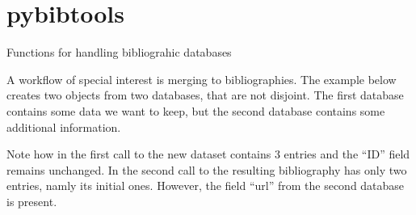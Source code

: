 \documentclass[letterpaper,10pt,english]{sphinxmanual}
\begin{document}
\section{pybibtools}
\label{modules/pybibtools:module-listb.pybibtools}\label{modules/pybibtools::doc}\label{modules/pybibtools:pybibtools}
Functions for handling bibliograhic databases

A workflow of special interest is merging to bibliographies. The example below
creates two {\hyperref[modules/pybibtools:listb.pybibtools.Bibliography]{}} objects from two databases, that are not
disjoint. The first database contains some data we want to keep, but the second
database contains some additional information.

Note how in the first call to  the new dataset contains 3 entries
and the ``ID'' field remains unchanged. In the second call to  the
resulting bibliography has only two entries, namly its initial ones. However,
the field ``url'' from the second database is present.
\end{document}
